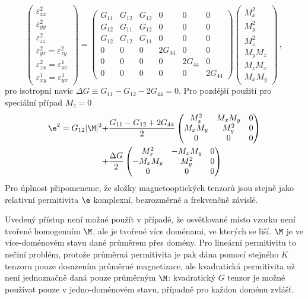 \begin{equation}
\begin{pmatrix}
\varepsilon^2_{xx} \\ \varepsilon^2_{yy} \\ \varepsilon^2_{zz} \\ \varepsilon^2_{yz}=\varepsilon^2_{zy} \\ \varepsilon^2_{zx}=\varepsilon^1_{xz} \\ \varepsilon^1_{xy}=\varepsilon^1_{yx}\end{pmatrix}
=\begin{pmatrix}
G_{11} & G_{12} & G_{12} & 0 & 0 & 0 \\
G_{12} & G_{11} & G_{12} & 0 & 0 & 0 \\
G_{12} & G_{12} & G_{11} & 0 & 0 & 0 \\
0 & 0 & 0 & 2G_{44} & 0 & 0 \\
0 & 0 & 0 & 0 & 2G_{44} & 0 \\
0 & 0 & 0 & 0 & 0 & 2G_{44}
\end{pmatrix}\begin{pmatrix}M_x^2 \\ M_y^2 \\ M_z^2 \\ M_y M_z \\ M_z M_x \\ M_x M_y \end{pmatrix} \,,
\end{equation}
pro isotropní navíc $\Delta G \equiv G_{11}-G_{12}-2G_{44}=0$.
Pro pozdější použití pro speciální případ $M_z=0$
\begin{align}
\e^2=
G_{12} |\M|^2 +& \frac{G_{11}-G_{12}+2G_{44}}{2}\begin{pmatrix}
M_x^2 & M_x M_y & 0 \\ M_x M_y & M_y^2 & 0 \\ 0 & 0 & 0
\end{pmatrix}\\
+& \frac{\Delta G}{2} \begin{pmatrix}
M_x^2 & -M_xM_y & 0\\ -M_xM_y & M_y^2 & 0 \\ 0 & 0 & 0
\end{pmatrix}
\end{align}
Pro úplnost připomeneme, že složky magnetooptických tenzorů jsou stejně jako relativní permitivita $\e$ komplexní, bezrozměrné a frekvenčně závislé.

Uvedený přístup není možné použít v případě, že osvětlované místo vzorku není tvořené homogenním $\M$, ale je tvořené více doménami, ve kterých se liší.
$\M$ je ve více-doménovém stavu dané průměrem přes domény.
Pro lineární permitivitu to nečiní problém, protože průměrná permitivita je pak dána pomocí stejného $K$ tenzoru pouze dosazením průměrné magnetizace, ale kvadratická permitivita už není jednoznačně daná pouze průměrným $\M$: kvadratický $G$ tenzor je možné používat pouze v jedno-doménovém stavu, případně pro každou doménu zvlášť.

